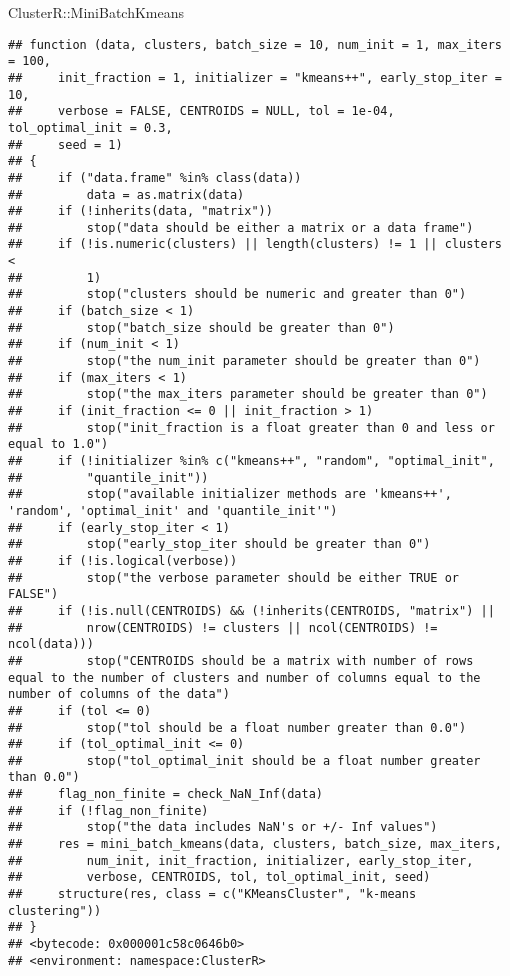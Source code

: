 \documentclass[
]{article}
\newenvironment{Shaded}{\begin{snugshade}}{\end{snugshade}}
\newcommand{\NormalTok}[1]{#1}
\newcommand{\SpecialCharTok}[1]{\textcolor[rgb]{0.00,0.00,0.00}{#1}}
\begin{document}
\begin{Shaded}
\begin{Highlighting}[]
\NormalTok{ClusterR}\SpecialCharTok{::}\NormalTok{MiniBatchKmeans}
\end{Highlighting}
\end{Shaded}

\begin{verbatim}
## function (data, clusters, batch_size = 10, num_init = 1, max_iters = 100, 
##     init_fraction = 1, initializer = "kmeans++", early_stop_iter = 10, 
##     verbose = FALSE, CENTROIDS = NULL, tol = 1e-04, tol_optimal_init = 0.3, 
##     seed = 1) 
## {
##     if ("data.frame" %in% class(data)) 
##         data = as.matrix(data)
##     if (!inherits(data, "matrix")) 
##         stop("data should be either a matrix or a data frame")
##     if (!is.numeric(clusters) || length(clusters) != 1 || clusters < 
##         1) 
##         stop("clusters should be numeric and greater than 0")
##     if (batch_size < 1) 
##         stop("batch_size should be greater than 0")
##     if (num_init < 1) 
##         stop("the num_init parameter should be greater than 0")
##     if (max_iters < 1) 
##         stop("the max_iters parameter should be greater than 0")
##     if (init_fraction <= 0 || init_fraction > 1) 
##         stop("init_fraction is a float greater than 0 and less or equal to 1.0")
##     if (!initializer %in% c("kmeans++", "random", "optimal_init", 
##         "quantile_init")) 
##         stop("available initializer methods are 'kmeans++', 'random', 'optimal_init' and 'quantile_init'")
##     if (early_stop_iter < 1) 
##         stop("early_stop_iter should be greater than 0")
##     if (!is.logical(verbose)) 
##         stop("the verbose parameter should be either TRUE or FALSE")
##     if (!is.null(CENTROIDS) && (!inherits(CENTROIDS, "matrix") || 
##         nrow(CENTROIDS) != clusters || ncol(CENTROIDS) != ncol(data))) 
##         stop("CENTROIDS should be a matrix with number of rows equal to the number of clusters and number of columns equal to the number of columns of the data")
##     if (tol <= 0) 
##         stop("tol should be a float number greater than 0.0")
##     if (tol_optimal_init <= 0) 
##         stop("tol_optimal_init should be a float number greater than 0.0")
##     flag_non_finite = check_NaN_Inf(data)
##     if (!flag_non_finite) 
##         stop("the data includes NaN's or +/- Inf values")
##     res = mini_batch_kmeans(data, clusters, batch_size, max_iters, 
##         num_init, init_fraction, initializer, early_stop_iter, 
##         verbose, CENTROIDS, tol, tol_optimal_init, seed)
##     structure(res, class = c("KMeansCluster", "k-means clustering"))
## }
## <bytecode: 0x000001c58c0646b0>
## <environment: namespace:ClusterR>
\end{verbatim}
\end{document}
